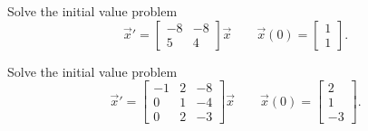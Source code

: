 \begin{exercise}
Solve the initial value problem
\[ {\vec{x}}' = \begin{bmatrix} -8 & -8 \\ 5 & 4 \end{bmatrix} \vec{x} \qquad \vec{x}(0) = \begin{bmatrix} 1 \\ 1 \end{bmatrix}. \]
\end{exercise}

\begin{exercise}
Solve the initial value problem
\[ {\vec{x}}' = \begin{bmatrix}-1 & 2 & -8 \\ 0 & 1 & -4 \\ 0 & 2 & -3 \end{bmatrix} \vec{x} \qquad \vec{x}(0) = \begin{bmatrix} 2 \\ 1 \\ -3 \end{bmatrix}. \]
\end{exercise}

\setcounter{exercise}{100}












